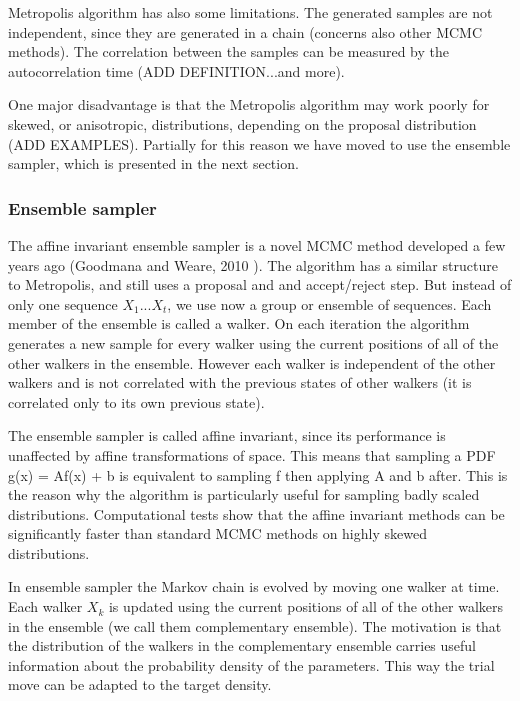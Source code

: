 \documentclass{wihuri}
\begin{document}
Metropolis algorithm has also some limitations. The generated samples are not independent, since they are generated in a chain (concerns also other MCMC methods). The correlation between the samples can be measured by the autocorrelation time (ADD DEFINITION...and more). 


One major disadvantage is that the Metropolis algorithm may work poorly for skewed, or anisotropic, distributions, depending on the proposal distribution (ADD EXAMPLES). Partially for this reason we have moved to use the ensemble sampler, which is presented in the next section. 



\subsubsection{Ensemble sampler}

The affine invariant ensemble sampler is a novel MCMC method developed a few years ago (Goodmana and Weare, 2010 \cite{ensemble1}). The algorithm has a similar structure to Metropolis, and still uses a proposal and and accept/reject step. But instead of only one sequence $X_{1}...X_{t}$, we use now a group or ensemble of sequences. Each member of the ensemble is called a walker. On each iteration the algorithm generates a new sample for every walker using the  current positions of all of the other walkers in
the ensemble. However each walker is independent of the other walkers and is not correlated with the previous states of other walkers (it is correlated only to its own previous state).




The ensemble sampler is called affine invariant, since its performance is unaffected by affine transformations of space. This means that sampling a PDF g(x) = Af(x) + b is equivalent to sampling
f then applying A and b after. This is the reason why the algorithm is particularly useful for sampling badly scaled distributions. Computational tests show that the affine invariant methods can be significantly faster than standard MCMC methods on highly skewed distributions.

In ensemble sampler the  Markov chain is evolved by moving one walker at time. Each walker $X_{k}$ is updated using the current positions of all of the other walkers in
the ensemble (we call them complementary ensemble). The motivation is that the distribution of the walkers in the complementary ensemble carries useful information about the probability density of the parameters. This way the trial move can be adapted to the target density.  
\end{document}
